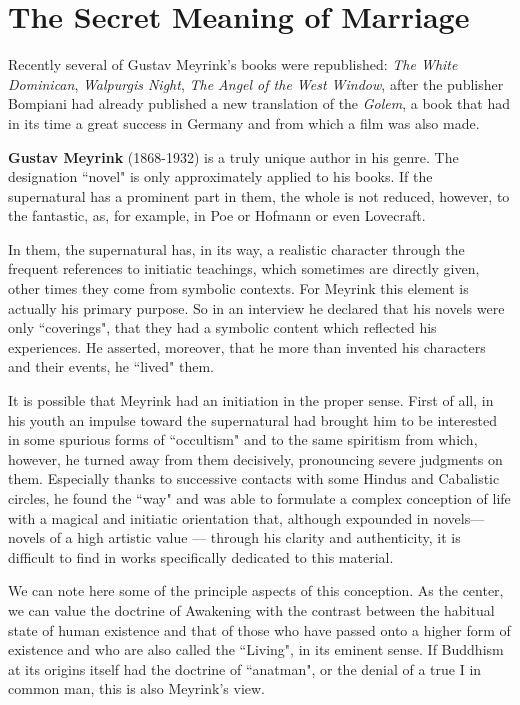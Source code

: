 \section{The Secret Meaning of Marriage}

Recently several of Gustav Meyrink's books were republished: \emph{The White Dominican}, \emph{Walpurgis Night}, \emph{The Angel of the West Window}, after the publisher Bompiani had already published a new translation of the \emph{Golem}, a book that had in its time a great success in Germany and from which a film was also made.

\textbf{Gustav Meyrink} (1868-1932) is a truly unique author in his genre. The designation ``novel" is only approximately applied to his books. If the supernatural has a prominent part in them, the whole is not reduced, however, to the fantastic, as, for example, in Poe or Hofmann or even Lovecraft.

In them, the supernatural has, in its way, a realistic character through the frequent references to initiatic teachings, which sometimes are directly given, other times they come from symbolic contexts. For Meyrink this element is actually his primary purpose. So in an interview he declared that his novels were only ``coverings", that they had a symbolic content which reflected his experiences. He asserted, moreover, that he more than invented his characters and their events, he ``lived" them.

It is possible that Meyrink had an initiation in the proper sense. First of all, in his youth an impulse toward the supernatural had brought him to be interested in some spurious forms of ``occultism" and to the same spiritism from which, however, he turned away from them decisively, pronouncing severe judgments on them. Especially thanks to successive contacts with some Hindus and Cabalistic circles, he found the ``way" and was able to formulate a complex conception of life with a magical and initiatic orientation that, although expounded in novels—novels of a high artistic value — through his clarity and authenticity, it is difficult to find in works specifically dedicated to this material.

We can note here some of the principle aspects of this conception. As the center, we can value the doctrine of Awakening with the contrast between the habitual state of human existence and that of those who have passed onto a higher form of existence and who are also called the ``Living", in its eminent sense. If Buddhism at its origins itself had the doctrine of ``anatman", or the denial of a true I in common man, this is also Meyrink's view.

